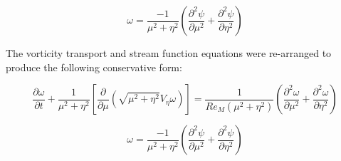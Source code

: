 \documentclass{article}
\newcommand{\pd}{\partial}
\begin{document}
\begin{equation}
\omega = \frac{-1}{\mu^2 + \eta^2} \left(\frac{\pd^2 \psi}{\pd \mu^2} + \frac{\pd^2 \psi}{\pd \eta^2} \right)
\end{equation}

The vorticity transport and stream function equations were re-arranged to produce the following conservative form:

\[
\frac{\pd \omega}{\pd t} + \frac{1}{\mu^2 + \eta^2} \left[\frac{\pd}{\pd \mu} \left(\sqrt{\mu^2 + \eta^2} V_\eta \omega \right) \right] = \frac{1}{Re_M(\mu^2 + \eta^2)} \left(\frac{\pd^2 \omega}{\pd \mu^2} + \frac{\pd^2 \omega}{\pd \eta^2} \right)
\]

\begin{equation}
\omega = \frac{-1}{\mu^2 + \eta^2} \left(\frac{\pd^2 \psi}{\pd \mu^2} + \frac{\pd^2 \psi}{\pd \eta^2} \right)
\label{eq:consv}
\end{equation}
\end{document}
